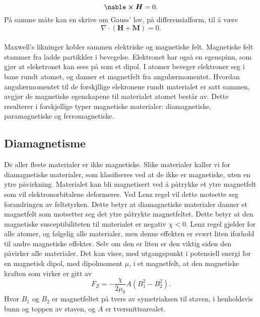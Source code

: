 \documentclass[%
 reprint,
 amsmath,amssymb,
 aps,
]{revtex4-1}
\begin{document}
\begin{equation}
  \nable \cross \bm{H} = 0.
\end{equation}På samme måte kan en skrive om Gauss' lov, på differensialform, til å være
\begin{equation}
  \nabla \cdot \left(\bm{H}+\bm{M}\right) = 0.
\end{equation}
\\
Maxwell's likninger kobler sammen elektriske og magnetiske felt. Magnetiske felt stammer fra ladde partikkler i bevegelse. Elektronet har også en egenspinn, som gjør at eleketronet kan sees på som et dipol. I atomer beveger elektroner seg i bane rundt atomet, og danner et magnetfelt fra angulærmomentet. Hvordan angulærmomentet til de forskjllige elekronene rundt materialet er satt sammen, avgjør de magnetiske egenskapene til materialet atomet består av. Dette resulterer i forskjellige typer magnetiske materialer: diamagnetiske, paramagnetiske og ferromagnetiske.
\subsection{Diamagnetisme}
De aller fleste materialer er ikke magnetiske. Slike materialer kaller vi for diamagnetiske materialer, som klasifiseres ved at de ikke er magnetiske, uten en ytre påvirkning. Materialet kan bli magnetisert ved å påtrykke et ytre magnetfelt som vil elektronorbitalene deformeres. Ved Lenz regel vil dette motsette seg forandringen av feltstyrken. Dette betyr at diamagnetiske materialer danner et magnetfelt som motsetter seg det ytre påtrykte magnetfeltet. Dette betyr at den magnetiske susceptibiliteten til materialet er negativ $\chi < 0$. Lenz regel gjelder for alle atomer, og følgelig alle materialer, men denne effekten er svært liten iforhold til andre magnetiske effekter. Selv om den er liten er den viktig siden den påvirker alle materialer. Det kan vises, med utgangspunkt i potensiell energi for en magnetisk dipol, med dipolmoment $\mu$, i et magnetfelt, at den magnetiske kraften som virker er gitt av
\begin{equation}
  F_Z = -\frac{\chi}{2\mu_0}A\left(B_1^2 - B_2^2\right).
\end{equation}
Hvor $B_1$ og $B_2$ er magnetfeltet på tvers av symetriaksen til staven, i henholdsvis bunn og toppen av staven, og $A$ er tversnittsarealet.
\end{document}

